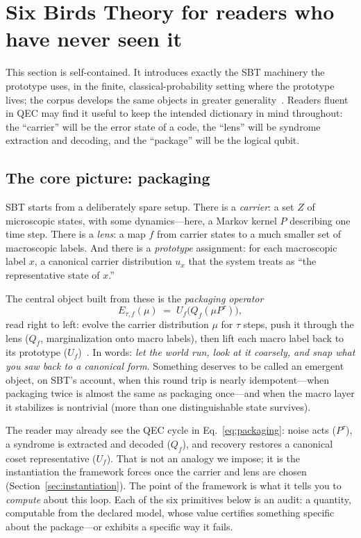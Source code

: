 \documentclass[11pt]{article}
\theoremstyle{definition}
\begin{document}
 \section{Six Birds Theory for readers who have never seen it}
\label{sec:sbt}

This section is self-contained. It introduces exactly the SBT machinery the prototype uses, in the finite, classical-probability setting where the prototype lives; the corpus develops the same objects in greater generality~\cite{sbt-f1,sbt-f3}. Readers fluent in QEC may find it useful to keep the intended dictionary in mind throughout: the ``carrier'' will be the error state of a code, the ``lens'' will be syndrome extraction and decoding, and the ``package'' will be the logical qubit.

\subsection{The core picture: packaging}
\label{sec:sbt-packaging}

SBT starts from a deliberately spare setup. There is a \emph{carrier}: a set $Z$ of microscopic states, with some dynamics---here, a Markov kernel $P$ describing one time step. There is a \emph{lens}: a map $f$ from carrier states to a much smaller set of macroscopic labels. And there is a \emph{prototype} assignment: for each macroscopic label $x$, a canonical carrier distribution $u_x$ that the system treats as ``the representative state of $x$.''

The central object built from these is the \emph{packaging operator}
\begin{equation}
E_{\tau,f}(\mu) \;=\; U_f\!\bigl(Q_f(\mu P^{\tau})\bigr),
\label{eq:packaging}
\end{equation}
read right to left: evolve the carrier distribution $\mu$ for $\tau$ steps, push it through the lens ($Q_f$, marginalization onto macro labels), then lift each macro label back to its prototype ($U_f$)~\cite{sbt-f1}. In words: \emph{let the world run, look at it coarsely, and snap what you saw back to a canonical form}. Something deserves to be called an emergent object, on SBT's account, when this round trip is nearly idempotent---when packaging twice is almost the same as packaging once---and when the macro layer it stabilizes is nontrivial (more than one distinguishable state survives).

The reader may already see the QEC cycle in Eq.~\eqref{eq:packaging}: noise acts ($P^\tau$), a syndrome is extracted and decoded ($Q_f$), and recovery restores a canonical coset representative ($U_f$). That is not an analogy we impose; it is the instantiation the framework forces once the carrier and lens are chosen (Section~\ref{sec:instantiation}). The point of the framework is what it tells you to \emph{compute} about this loop. Each of the six primitives below is an audit: a quantity, computable from the declared model, whose value certifies something specific about the package---or exhibits a specific way it fails.
\end{document}
